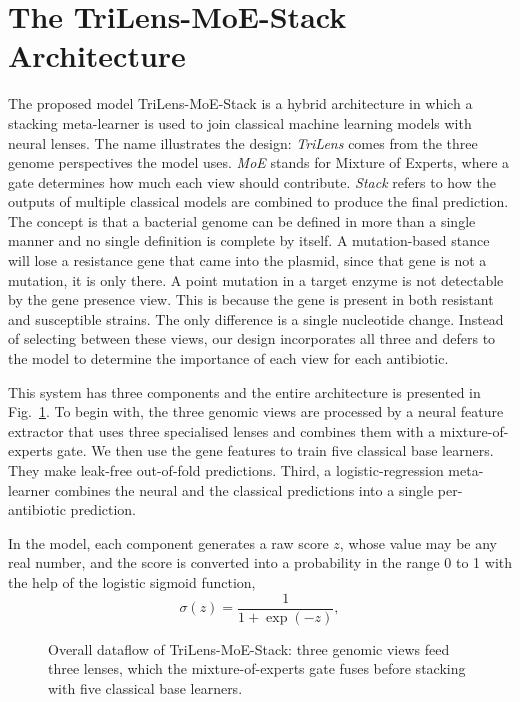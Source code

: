 \documentclass[journal]{IEEEtran}
\begin{document}
\section{The TriLens-MoE-Stack Architecture}
\label{sec:architecture}

The proposed model TriLens-MoE-Stack is a hybrid architecture in which a stacking
meta-learner is used to join classical machine learning models with neural lenses.
The name illustrates the design: \textit{TriLens} comes from the three genome
perspectives the model uses. \textit{MoE} stands for Mixture of Experts, where a
gate determines how much each view should contribute. \textit{Stack} refers to how
the outputs of multiple classical models are combined to produce the final
prediction. The concept is that a bacterial genome can be defined in more than a
single manner and no single definition is complete by itself. A mutation-based
stance will lose a resistance gene that came into the plasmid, since that gene is
not a mutation, it is only there. A point mutation in a target enzyme is not
detectable by the gene presence view. This is because the gene is present in both
resistant and susceptible strains. The only difference is a single nucleotide
change. Instead of selecting between these views, our design incorporates all three
and defers to the model to determine the importance of each view for each
antibiotic.

This system has three components and the entire architecture is presented in
Fig.~\ref{fig:trilens-overall}. To begin with, the three genomic views are
processed by a neural feature extractor that uses three specialised lenses and
combines them with a mixture-of-experts gate. We then use the gene features to train
five classical base learners. They make leak-free out-of-fold predictions. Third, a
logistic-regression meta-learner combines the neural and the classical predictions
into a single per-antibiotic prediction.

In the model, each component generates a raw score $z$, whose value may be any real
number, and the score is converted into a probability in the range 0 to 1 with the
help of the logistic sigmoid function,
\begin{equation}
\sigma(z) = \frac{1}{1 + \exp(-z)},
\label{eq:sigmoid}
\end{equation}

\begin{figure}[!tb]
\centering
\resizebox{0.92\textwidth}{!}{}
\caption{Overall dataflow of TriLens-MoE-Stack: three genomic views feed three
lenses, which the mixture-of-experts gate fuses before stacking with five classical
base learners.}
\label{fig:trilens-overall}
\end{figure}
\end{document}
